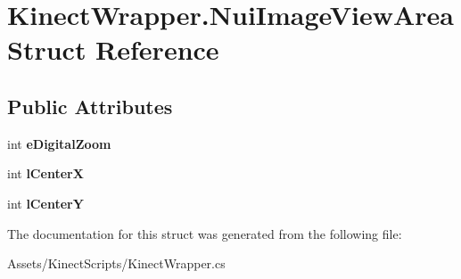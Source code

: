 \hypertarget{struct_kinect_wrapper_1_1_nui_image_view_area}{}\section{Kinect\+Wrapper.\+Nui\+Image\+View\+Area Struct Reference}
\label{struct_kinect_wrapper_1_1_nui_image_view_area}
\subsection*{Public Attributes}
\begin{DoxyCompactItemize}
\item 
\mbox{\label{struct_kinect_wrapper_1_1_nui_image_view_area_a56968a6e526e2e8700a6d0a996a039de}} 
int {\bfseries e\+Digital\+Zoom}
\item 
\mbox{\label{struct_kinect_wrapper_1_1_nui_image_view_area_a903ae34c6272356bec3fdff63397a3eb}} 
int {\bfseries l\+CenterX}
\item 
\mbox{\label{struct_kinect_wrapper_1_1_nui_image_view_area_a87a8110d362e3bcba5a37cfa13a00ead}} 
int {\bfseries l\+CenterY}
\end{DoxyCompactItemize}


The documentation for this struct was generated from the following file\+:\begin{DoxyCompactItemize}
\item 
Assets/\+Kinect\+Scripts/Kinect\+Wrapper.\+cs\end{DoxyCompactItemize}
